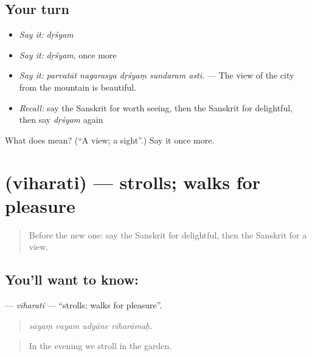 \subsection*{Your turn}
\begin{itemize}
\raggedright
  \item \emph{Say it:} \emph{dṛśyam}
  \item \emph{Say it:} \emph{dṛśyam}, once more
  \item \emph{Say it:} \emph{parvatāt nagarasya dṛśyaṃ sundaram asti.} — The view of the city from the mountain is beautiful.
  \item \emph{Recall:} say the Sanskrit for worth seeing, then the Sanskrit for delightful, then say \emph{dṛśyam} again
\end{itemize}

\begin{tcolorbox}[breakable,colback=teal!4,colframe=teal!35!black,title={Before you move on}]
What does  mean? (\textquotedblleft{}A view; a sight\textquotedblright{}.) Say it once more.
\end{tcolorbox}
\section[\texorpdfstring{\sk{विहरति} (viharati)}{विहरति (viharati)}]{ (viharati) — strolls; walks for pleasure}

\label{lesson:SA-C424-viharati}



\begin{quote}
Before the new one: say the Sanskrit for delightful, then the Sanskrit for a view.
\end{quote}

\subsection*{You'll want to know: }
\textbf{} — \emph{viharati} — \textquotedblleft{}strolls; walks for pleasure\textquotedblright{}.

\begin{quote}
   
\end{quote}

\begin{quote}
\emph{sāyaṃ vayam udyāne viharāmaḥ.}
\end{quote}

\begin{quote}
In the evening we stroll in the garden.
\end{quote}

